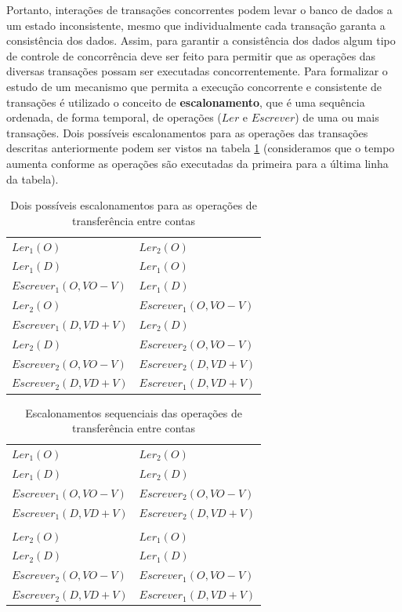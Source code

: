 \documentclass[11pt,twoside,a4paper]{book}
\begin{document}
Portanto, interações de transações concorrentes podem levar o banco de dados a um estado inconsistente, mesmo que individualmente cada transação garanta a consistência dos dados. Assim, para garantir a consistência dos dados algum tipo de controle de concorrência deve ser feito para permitir que as operações das diversas transações possam ser executadas concorrentemente. Para formalizar o estudo de um mecanismo que permita a execução concorrente e consistente de transações é utilizado o conceito de \textbf{escalonamento}, que é uma sequência ordenada, de forma temporal, de operações ($Ler$ e $Escrever$) de uma ou mais transações. Dois possíveis escalonamentos para as operações das transações descritas anteriormente podem ser vistos na tabela \ref{tab:exemplo_escalonamento} (consideramos que o tempo aumenta conforme as operações são executadas da primeira para a última linha da tabela).

\begin{table}
\caption{Dois possíveis escalonamentos para as operações de transferência entre contas}
\label{tab:exemplo_escalonamento}
\centering
\begin{tabular}{ | l | l | }
	\hline
	$Ler_1(O)$&$Ler_2(O)$\\
	$Ler_1(D)$&$Ler_1(O)$\\
	$Escrever_1(O, VO - V)$&$Ler_1(D)$\\
	$Ler_2(O)$&$Escrever_1(O, VO - V)$\\
	$Escrever_1(D, VD + V)$&$Ler_2(D)$\\
	$Ler_2(D)$&$Escrever_2(O, VO - V)$\\
	$Escrever_2(O, VO - V)$&$Escrever_2(D, VD + V)$\\
	$Escrever_2(D, VD + V)$&$Escrever_1(D, VD + V)$\\
	\hline
\end{tabular}
\end{table}

\begin{table}
\caption{Escalonamentos sequenciais das operações de transferência entre contas}
\label{tab:escalonamento_sequencial}
\centering
\begin{tabular}{ | l | l | }
	\hline
	$Ler_1(O)$&$Ler_2(O)$\\
	$Ler_1(D)$&$Ler_2(D)$\\
	$Escrever_1(O, VO - V)$&$Escrever_2(O, VO - V)$\\
	$Escrever_1(D, VD + V)$&$Escrever_2(D, VD + V)$\\
	&\\
	$Ler_2(O)$&$Ler_1(O)$\\
	$Ler_2(D)$&$Ler_1(D)$\\
	$Escrever_2(O, VO - V)$&$Escrever_1(O, VO - V)$\\
	$Escrever_2(D, VD + V)$&$Escrever_1(D, VD + V)$\\
	\hline
\end{tabular}
\end{table}
\end{document}
